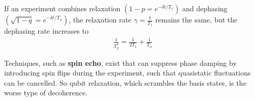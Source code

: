 If an experiment combines relaxation $(1 - p = e^{-\delta t/T_1} )$ and dephasing $(\sqrt{1-q} = e^{-\delta t/T_\phi} )$, the relaxation rate $\gamma=\frac{1}{T_1}$ remains the same, but the dephasing rate increases to
\begin{align*}
    \frac{1}{T_2^*}=\frac{1}{2T_1}+\frac{1}{T_\phi}
\end{align*}

Techniques, such as \textbf{spin echo}, exist that can suppress phase damping by introducing spin flips during the experiment, such that quasistatic fluctuations can be cancelled. So qubit relaxation, which scrambles the basis states, is the worse type of decoherence.